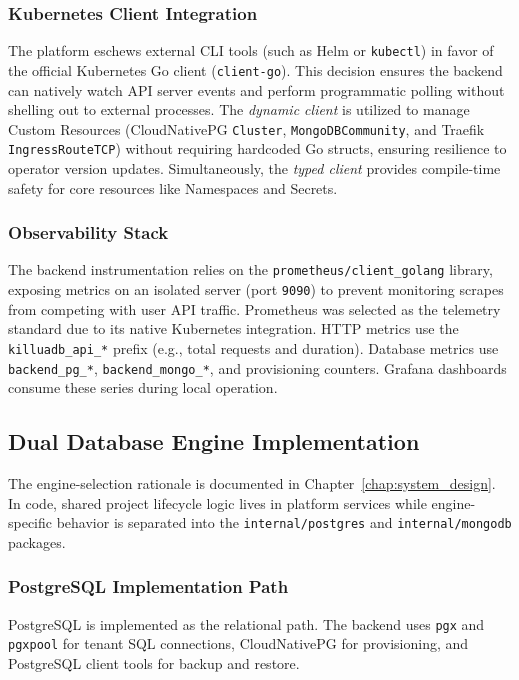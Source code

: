 \subsubsection{Kubernetes Client Integration}
The platform eschews external CLI tools (such as Helm or \texttt{kubectl}) in favor of the official Kubernetes Go client (\texttt{client-go}). This decision ensures the backend can natively watch API server events and perform programmatic polling without shelling out to external processes. The \textit{dynamic client} is utilized to manage Custom Resources (CloudNativePG \texttt{Cluster}, \texttt{MongoDBCommunity}, and Traefik \texttt{IngressRouteTCP}) without requiring hardcoded Go structs, ensuring resilience to operator version updates. Simultaneously, the \textit{typed client} provides compile-time safety for core resources like Namespaces and Secrets.

\subsubsection{Observability Stack}
The backend instrumentation relies on the \texttt{prometheus/client\_golang} library, exposing metrics on an isolated server (port \texttt{9090}) to prevent monitoring scrapes from competing with user API traffic. Prometheus was selected as the telemetry standard due to its native Kubernetes integration. HTTP metrics use the \texttt{killuadb\_api\_*} prefix (e.g., total requests and duration). Database metrics use \texttt{backend\_pg\_*}, \texttt{backend\_mongo\_*}, and provisioning counters. Grafana dashboards consume these series during local operation.

\subsection{Dual Database Engine Implementation}

The engine-selection rationale is documented in Chapter~\ref{chap:system_design}. In code, shared project lifecycle logic lives in platform services while engine-specific behavior is separated into the \texttt{internal/postgres} and \texttt{internal/mongodb} packages.

\subsubsection{PostgreSQL Implementation Path}

PostgreSQL is implemented as the relational path. The backend uses \texttt{pgx} and \texttt{pgxpool} for tenant SQL connections, CloudNativePG for provisioning, and PostgreSQL client tools for backup and restore.

